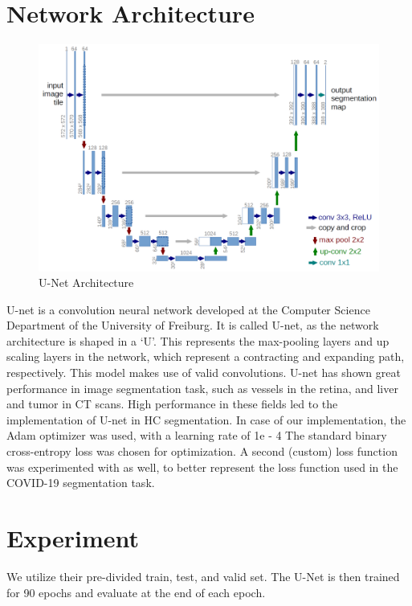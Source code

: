 \documentclass{article}
\begin{document}
\begin{multicols}{2}
\section{Network Architecture}
\begin{figure}[H]
    \centering
    \includegraphics[width=0.8\linewidth]{u-net-architecture.png}
    \caption{U-Net Architecture}
    \label{fig:unet}
\end{figure}
U-net is a convolution neural network developed at the Computer Science Department of the University of Freiburg. It is called U-net, as the network architecture is shaped in a ‘U’. This represents the max-pooling layers and up scaling layers in the network, which represent a contracting and expanding path, respectively. This model makes use of valid convolutions. U-net has shown great performance in image segmentation task, such as vessels in the retina, and liver and tumor in CT scans. High performance in these fields led to the implementation of U-net in HC segmentation. In case of our implementation, the Adam optimizer was used, with a learning rate of 1e - 4 The standard binary cross-entropy loss was chosen for optimization. A second (custom) loss function was experimented with as well, to better represent the loss function used in the COVID-19 segmentation task.
\section{Experiment}
We utilize their pre-divided train, test, and valid set. The U-Net is then trained for 90 epochs and evaluate at the end of each epoch.


\end{multicols}
\end{document}
